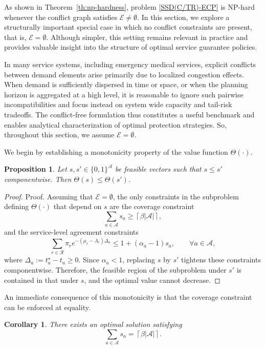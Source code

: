 \documentclass[letter,11pt, reqno]{amsart}
\newtheorem{proposition}{Proposition}
\newtheorem{corollary}{Corollary}
\def\A{\mathcal{A}}
\begin{document}
As shown in Theorem~\ref{th:np-hardness}, problem \ref{SSD(C/TR)-ECP} is NP-hard whenever
the conflict graph satisfies $\mathcal E \neq \emptyset$.
In this section, we explore a structurally important special case in which no
conflict constraints are present, that is, $\mathcal E = \emptyset$.
Although simpler, this setting remains relevant in practice and provides
valuable insight into the structure of optimal service guarantee policies.

In many service systems, including emergency medical services, explicit conflicts
between demand elements arise primarily due to localized congestion effects.
When demand is sufficiently dispersed in time or space, or when the planning
horizon is aggregated at a high level, it is reasonable to ignore such pairwise
incompatibilities and focus instead on system wide capacity and tail-risk
tradeoffs.
The conflict-free formulation thus constitutes a useful benchmark and enables
analytical characterization of optimal protection strategies. So, throughout this section, we assume $\mathcal E = \emptyset$.

We begin by establishing a monotonicity property of the value function
$\Theta(\cdot)$.

\begin{proposition}\label{prop:monotonicity}
Let $s,s' \in \{0,1\}^{\mathcal A}$ be feasible vectors such that
$s \le s'$ componentwise. Then $\Theta(s) \le \Theta(s')$.
\end{proposition}

\begin{proof}{Proof.}
Assuming that $\mathcal{E}=\emptyset$, the only constraints in the subproblem defining $\Theta(\cdot)$ that depend on $s$
are the coverage constraint
$$
\sum_{a \in \mathcal A} s_a \ge \left\lceil \beta |\A|\right\rceil,
$$
and the service-level agreement constraints
$$
\sum_{r \in \mathcal R} \pi_r e^{-(\mu_r-\Lambda_r)\Delta_a}
\le 1 + (\alpha_a - 1)s_a,
\qquad \forall a \in \mathcal A,
$$
where $\Delta_a := t_a^\star - t_a \ge 0$.
Since $\alpha_a < 1$, replacing $s$ by $s'$ tightens these constraints
componentwise. Therefore, the feasible region of the subproblem under $s'$ is
contained in that under $s$, and the optimal value cannot decrease.%
\end{proof}

An immediate consequence of this monotonicity is that the coverage constraint can
be enforced at equality.

\begin{corollary}
There exists an optimal solution satisfying
$$
\sum_{a \in \mathcal A} s_a = \left\lceil \beta |\A|\right\rceil.
$$
\end{corollary}
\end{document}
